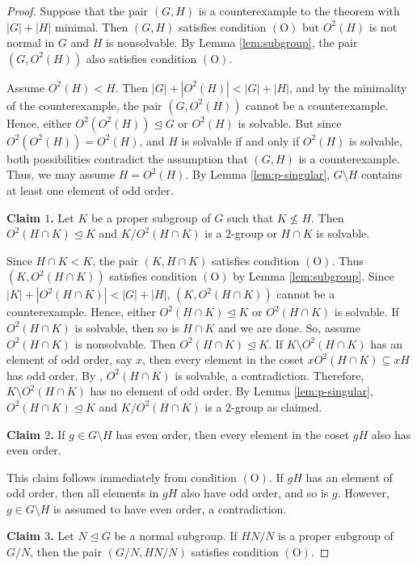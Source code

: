\documentclass[twoside,a4paper,reqno,11pt]{amsart}
\newcommand{\<}{\langle}
\renewcommand{\>}{\rangle}
\newcommand{\leqs}{\leqslant}
\newcommand{\OO}{\mathrm {(O)}}
\renewcommand{\leq}{\leqs}
\renewcommand{\:}{\colon}
\theoremstyle{definition}
\begin{document}
\begin{proof}
Suppose that the pair $(G,H)$ is a counterexample to the theorem with $|G|+|H|$ minimal. Then $(G,H)$ satisfies condition $\OO$ but $O^2(H)$ is not normal in $G$ and $H$ is nonsolvable. By Lemma \ref{lem:subgroup}, the pair $(G,O^2(H))$ also satisfies condition $\OO$. 


Assume $O^2(H)<H$. Then $|G|+|O^2(H)|<|G|+|H|$, and by the minimality of the counterexample, the pair $(G,O^2(H))$ cannot be a counterexample. Hence,  either $O^2(O^2(H))\unlhd G$ or $O^2(H)$ is solvable.  But since $O^2(O^2(H))=O^2(H)$, and $H$ is solvable if and only if $O^2(H)$ is solvable, both possibilities contradict the assumption that $(G,H)$ is a counterexample. Thus, we may assume $H=O^2(H)$. By Lemma \ref{lem:p-singular}, $G\setminus H$ contains at least one  element of odd order. 

\smallskip
\textbf{Claim $1$.} 
Let $K$ be a proper subgroup of $G$ such that $K\not\leq H$. Then $O^2(H\cap K)\unlhd K$ and $K/O^2(H\cap K)$ is a $2$-group or $H\cap K$ is solvable.
\smallskip

Since $H\cap K<K$, the pair $(K,H\cap K)$  satisfies condition $\OO$. Thus $(K,O^2(H\cap K))$ satisfies condition $\OO$ by Lemma \ref{lem:subgroup}. Since $|K|+|O^2(H\cap K)|<|G|+|H|$,  $(K,O^2(H\cap K))$ cannot be a counterexample. Hence, either $O^2(H\cap K)\unlhd K$ or $O^2(H\cap K)$ is solvable. If  $O^2(H\cap K)$ is solvable, then so is $H\cap K$ and we are done. So, assume $O^2(H\cap K)$ is nonsolvable. Then $O^2(H\cap K) \unlhd K$. If $K\setminus O^2(H\cap K)$ has an element of odd order, say $x$, then  every element in the coset $xO^2(H\cap K)\subseteq xH$ has odd order. By  \cite[Theorem B]{GN},  $O^2(H\cap K)$ is solvable, a contradiction. Therefore, $K\setminus O^2(H\cap K)$  has no element of odd order. By Lemma \ref{lem:p-singular}, $O^2(H\cap K) \unlhd K$ and $K/O^2(H\cap K)$ is a $2$-group as claimed.
 

\smallskip
\textbf{Claim $2$.}  
If $ g \in G \setminus H $ has even order, then every element in the coset $ gH $ also has even order.
\smallskip

This claim follows immediately from condition $ \OO $. If $gH$ has an element of odd order, then all elements in $gH$ also have odd order, and so is $g$. However, $g \in G\setminus H$ is assumed to have even order, a contradiction.




\smallskip
\textbf{Claim $3$.}  
Let $ N \trianglelefteq G $ be a normal subgroup. If $ HN/N $ is a proper subgroup of $ G/N $, then the pair $ (G/N, HN/N) $ satisfies condition $ \OO $.
\smallskip


\end{proof}
\end{document}
